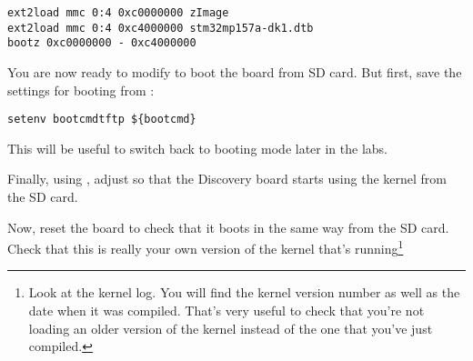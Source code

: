 \begin{verbatim}
ext2load mmc 0:4 0xc0000000 zImage
ext2load mmc 0:4 0xc4000000 stm32mp157a-dk1.dtb
bootz 0xc0000000 - 0xc4000000
\end{verbatim}

You are now ready to modify  to boot the board
from SD card. But first, save the settings for booting from
:

\begin{verbatim}
setenv bootcmdtftp ${bootcmd}
\end{verbatim}

This will be useful to switch back to  booting mode
later in the labs.

Finally, using , adjust  so that
the Discovery board starts using the kernel from the SD card.

Now, reset the board to check that it boots in the same way from the
SD card. Check that this is really your own version of the kernel
that's running\footnote{Look at the kernel log. You will find the
kernel version number as well as the date when it was compiled.
That's very useful to check that you're not loading an older version
of the kernel instead of the one that you've just compiled.}

